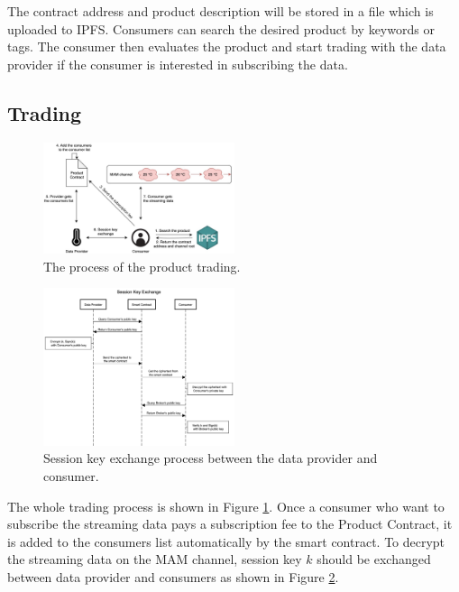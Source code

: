 \documentclass[journal,10pt,a4paper]{IEEEtran}
\begin{document}
The contract address and product description will be stored in a file which is uploaded to IPFS. Consumers can search the desired product by keywords or tags. The consumer then evaluates the product and start trading with the data provider if the consumer is interested in subscribing the data.

\subsection{Trading}

\begin{figure}[h]
    \centering
    \includegraphics[width=0.5\textwidth]{trading_product}
    \caption{The process of the product trading.}
    \label{fig:trading_product}
\end{figure}

\begin{figure}[h]
    \centering
    \includegraphics[width=0.5\textwidth]{key_exchange}
    \caption{Session key exchange process between the data provider and consumer.}
    \label{fig:key_exchange}
\end{figure}

The whole trading process is shown in Figure \ref{fig:trading_product}. Once a consumer who want to subscribe the streaming data pays a subscription fee to the Product Contract, it is added to the consumers list automatically by the smart contract. To decrypt the streaming data on the MAM channel, session key $k$ should be exchanged between data provider and consumers as shown in Figure \ref{fig:key_exchange}.
\end{document}
